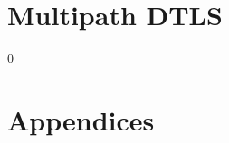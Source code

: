 \documentclass[11pt,a4paper,oldfontcommands]{memoir}
\newcommand\draft{0}
\begin{document}
\markboth{}{}
\part{Multipath DTLS}

\fi
{}\draft




\glsaddall
\printglossaries

\clearpage
\markboth{}{}
\part*{Appendices}

\appendix


\fi


\end{document}
